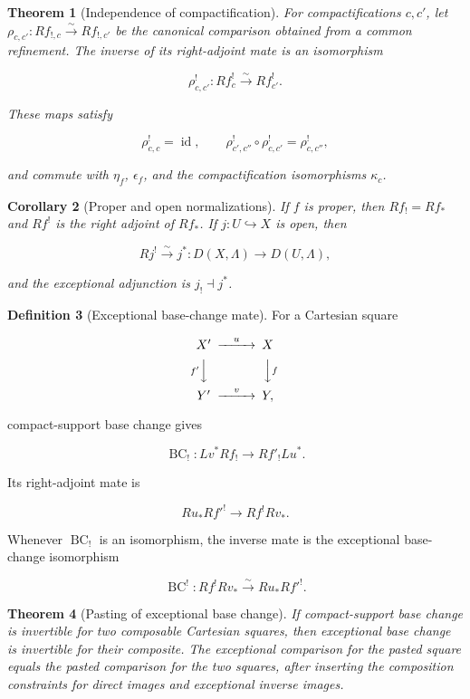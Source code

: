 \documentclass[10pt]{article}
\newtheorem{theorem}{Theorem}[section]
\newtheorem{corollary}[theorem]{Corollary}
\theoremstyle{definition}
\newtheorem{definition}[theorem]{Definition}
\begin{document}
\begin{theorem}[Independence of compactification]
For compactifications \(c,c'\), let
\(\rho_{c,c'}:Rf_{!,c}\xrightarrow{\sim}Rf_{!,c'}\) be the canonical
comparison obtained from a common refinement.  The inverse of its
right-adjoint mate is an isomorphism

\[
 \rho^!_{c,c'}:Rf^!_c\xrightarrow{\sim}Rf^!_{c'}.
\]

These maps satisfy

\[
 \rho^!_{c,c}=\operatorname{id},\qquad
 \rho^!_{c',c''}\circ\rho^!_{c,c'}=\rho^!_{c,c''},
\]

and commute with \(\eta_f\), \(\epsilon_f\), and the compactification
isomorphisms \(\kappa_c\).
\end{theorem}

\begin{corollary}[Proper and open normalizations]
If \(f\) is proper, then \(Rf_!=Rf_*\) and \(Rf^!\) is the right adjoint of
\(Rf_*\).  If \(j:U\hookrightarrow X\) is open, then

\[
 Rj^!\xrightarrow{\sim}j^*:D(X,\Lambda)\longrightarrow D(U,\Lambda),
\]

and the exceptional adjunction is \(j_!\dashv j^*\).
\end{corollary}

\begin{definition}[Exceptional base-change mate]
For a Cartesian square

\[
\begin{CD}
X' @>{u}>> X\\
@V{f'}VV @VV{f}V\\
Y' @>{v}>> Y,
\end{CD}
\]

compact-support base change gives

\[
 \operatorname{BC}_!:Lv^*Rf_!\longrightarrow Rf'_!Lu^*.
\]

Its right-adjoint mate is

\[
 Ru_*Rf'^!\longrightarrow Rf^!Rv_*.
\]

Whenever \(\operatorname{BC}_!\) is an isomorphism, the inverse mate is the
exceptional base-change isomorphism

\[
 \operatorname{BC}^!:Rf^!Rv_*\xrightarrow{\sim}Ru_*Rf'^!.
\]
\end{definition}

\begin{theorem}[Pasting of exceptional base change]
If compact-support base change is invertible for two composable Cartesian
squares, then exceptional base change is invertible for their composite.
The exceptional comparison for the pasted square equals the pasted
comparison for the two squares, after inserting the composition constraints
for direct images and exceptional inverse images.
\end{theorem}
\end{document}
